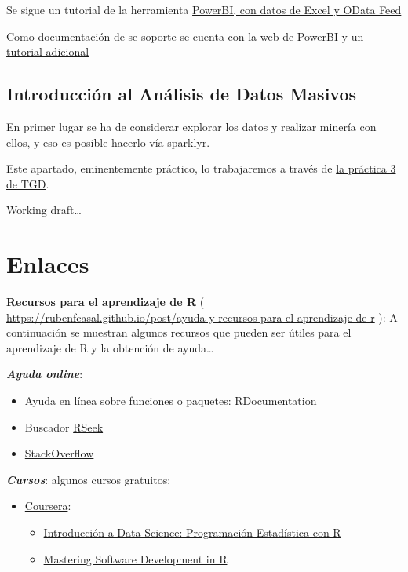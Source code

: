 \documentclass[
]{book}
\begin{document}
Se sigue un tutorial de la herramienta \href{https://docs.microsoft.com/es-es/power-bi/desktop-tutorial-analyzing-sales-data-from-excel-and-an-odata-feed}{PowerBI, con datos de Excel y OData Feed}

Como documentación de se soporte se cuenta con la web de \href{https://docs.microsoft.com/es-es/power-bi/}{PowerBI} y \href{https://ccance.net/manuales/powerbi/capitulo_01_introduccion.pdf}{un tutorial adicional}

\section{Introducción al Análisis de Datos Masivos}\label{introducciuxf3n-al-anuxe1lisis-de-datos-masivos}

En primer lugar se ha de considerar explorar los datos y realizar minería con ellos, y eso es posible hacerlo vía sparklyr.

Este apartado, eminentemente práctico, lo trabajaremos a través de \href{https://www.kaggle.com/gltaboada/t3-practice3-flights}{la práctica 3 de TGD}.

\appendix


Working draft\ldots{}

\chapter{Enlaces}\label{links}

\textbf{Recursos para el aprendizaje de R} ( \url{https://rubenfcasal.github.io/post/ayuda-y-recursos-para-el-aprendizaje-de-r}
): A continuación se muestran algunos recursos que pueden ser útiles para el aprendizaje de R y la obtención de ayuda\ldots{}

\textbf{\emph{Ayuda online}}:

\begin{itemize}
\item
  Ayuda en línea sobre funciones o paquetes: \href{https://www.rdocumentation.org/}{RDocumentation}
\item
  Buscador \href{http://rseek.org/}{RSeek}
\item
  \href{http://stackoverflow.com/questions/tagged/r}{StackOverflow}
\end{itemize}

\textbf{\emph{Cursos}}:
algunos cursos gratuitos:

\begin{itemize}
\item
  \href{https://www.coursera.org/}{Coursera}:

  \begin{itemize}
  \item
    \href{https://www.coursera.org/learn/intro-data-science-programacion-estadistica-r}{Introducción a Data Science: Programación Estadística con R}
  \item
    \href{https://www.coursera.org/specializations/r}{Mastering Software Development in R}
  \end{itemize}
\end{itemize}
\end{document}
